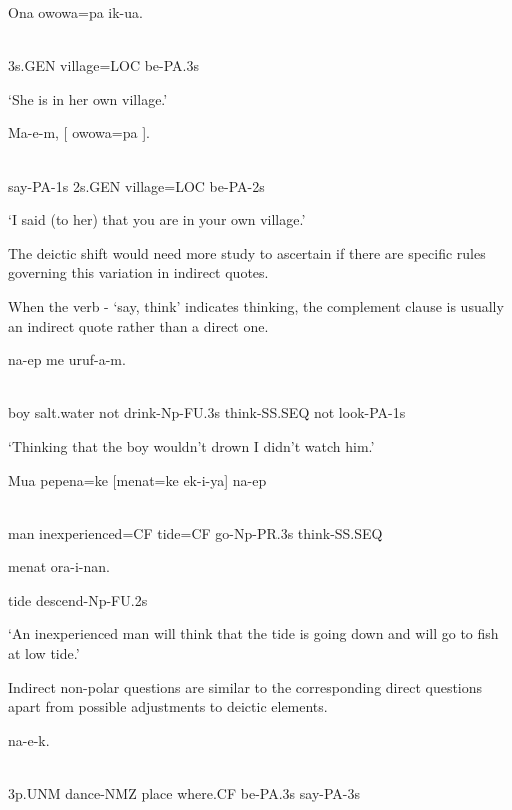 \ea%
\label{ex:x1267}
\gll Ona  owowa=pa  ik-ua. \\
      \\
\glt
\z

3s.GEN  village=LOC  be-PA.3s

`She is in her own village.'

\ea%
\label{ex:x1266}
\gll Ma-e-m,  [ owowa=pa  ]. \\
      \\
\glt
\z

say-PA-1s  2s.GEN  village=LOC  be-PA-2s

`I said (to her) that you are in your own village.'

The deictic shift would need more study to ascertain if there are specific rules governing this variation in indirect quotes.

When the verb - `say, think' indicates thinking, the complement clause is usually an indirect quote rather than a direct one. 

\ea%
\label{ex:x1588}
  na-ep  me  uruf-a-m. \\
      \\
\glt
\z

boy  salt.water  not  drink-Np-FU.3s  think-SS.SEQ  not  look-PA-1s

`Thinking that the boy wouldn't drown I didn't watch him.'

\ea%
\label{ex:x1589}
\gll Mua  pepena=ke  [menat=ke  ek-i-ya]  na-ep  \\
      \\
\glt
\z

man  inexperienced=CF  tide=CF  go-Np-PR.3s  think-SS.SEQ

menat  ora-i-nan.

tide  descend-Np-FU.2s

`An inexperienced man will think that the tide is going down and will go to fish at low tide.'

Indirect non-polar questions are similar to the corresponding direct questions apart from possible adjustments to deictic elements.

\ea%
\label{ex:x1592}
  na-e-k.  \\
      \\
\glt
\z

3p.UNM  dance-NMZ  place  where.CF  be-PA.3s  say-PA-3s

